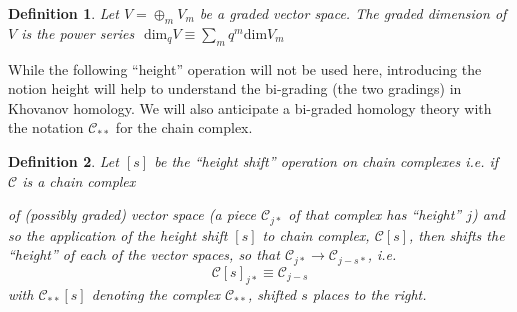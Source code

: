 \documentclass[a4paper,titlepage,twoside]{book}
\newtheorem{definition}{Definition}
\begin{document}
\begin{definition}
Let $V = \oplus_{m} V_m$ be a graded vector space. The graded dimension of $V$ is the power series $\text{ dim}_q{V}  \equiv \sum_m q^m \text{dim}{V_m}$  \end{definition}

While the following ``height'' operation will not be used here, introducing the notion height will help to understand the bi-grading (the two gradings) in Khovanov homology.  We will also anticipate a bi-graded homology theory with the notation $\mathcal{C}_{**}$ for the chain complex.


\begin{definition} Let $[s]$ be the ``height shift'' operation on chain complexes i.e. if $\mathcal{C} $ is a chain complex 
\begin{center}
\end{center}
of (possibly graded) vector space (a piece $\mathcal{C}_{j*}$ of that complex has ``height'' $j$) and so the application of the height shift $[s]$ to chain complex, $\mathcal{C}[s]$, then shifts the ``height'' of each of the vector spaces, so that $\mathcal{C}_{j*} \to \mathcal{C}_{j-s*}$, i.e.
\begin{equation}
  \mathcal{C}[s]_{j*} \equiv \mathcal{C}_{j-s}
\end{equation}
with $\mathcal{C}_{**}{ [s]}$ denoting the complex $\mathcal{C}_{**}$, shifted $s$ places to the right.  
\end{definition}
\end{document}
